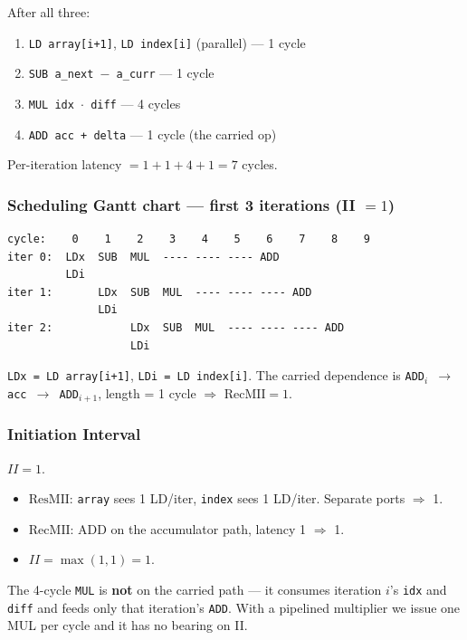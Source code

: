 \documentclass[11pt,a4paper]{article}
\begin{document}
After all three:

\begin{enumerate}[noitemsep]
  \item \texttt{LD array[i+1]}, \texttt{LD index[i]} (parallel) --- 1 cycle
  \item \texttt{SUB a\_next $-$ a\_curr} --- 1 cycle
  \item \texttt{MUL idx $\cdot$ diff} --- 4 cycles
  \item \texttt{ADD acc + delta} --- 1 cycle (the carried op)
\end{enumerate}

Per-iteration latency $= 1 + 1 + 4 + 1 = 7$ cycles.

\subsubsection*{Scheduling Gantt chart --- first 3 iterations (II $=1$)}

\begin{lstlisting}[style=schedule]
cycle:    0    1    2    3    4    5    6    7    8    9
iter 0:  LDx  SUB  MUL  ---- ---- ---- ADD
         LDi
iter 1:       LDx  SUB  MUL  ---- ---- ---- ADD
              LDi
iter 2:            LDx  SUB  MUL  ---- ---- ---- ADD
                   LDi
\end{lstlisting}

\noindent\texttt{LDx = LD array[i+1]}, \texttt{LDi = LD index[i]}. The carried dependence is \texttt{ADD$_i$ $\to$ acc $\to$ ADD$_{i+1}$}, length = 1 cycle $\Rightarrow$ $\mathrm{RecMII} = 1$.

\subsubsection*{Initiation Interval}

$II = 1$.

\begin{itemize}[noitemsep]
  \item $\mathrm{ResMII}$: \texttt{array} sees 1 LD/iter, \texttt{index} sees 1 LD/iter. Separate ports $\Rightarrow$ 1.
  \item $\mathrm{RecMII}$: ADD on the accumulator path, latency 1 $\Rightarrow$ 1.
  \item $II = \max(1, 1) = 1$.
\end{itemize}

The 4-cycle \texttt{MUL} is \textbf{not} on the carried path --- it consumes iteration $i$'s \texttt{idx} and \texttt{diff} and feeds only that iteration's \texttt{ADD}. With a pipelined multiplier we issue one MUL per cycle and it has no bearing on II.
\end{document}
